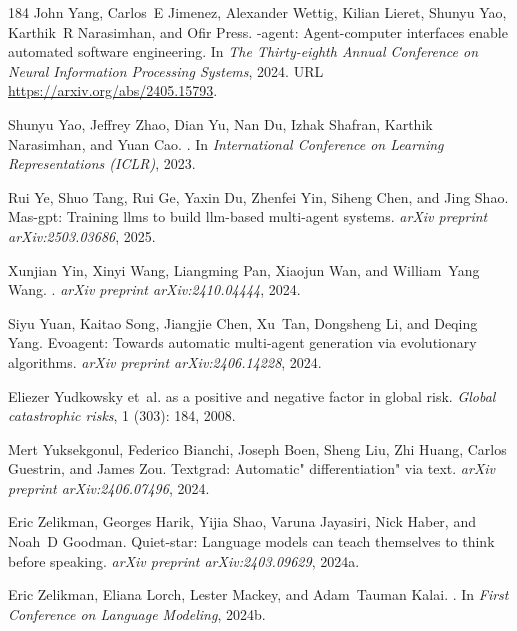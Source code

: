 \begin{thebibliography}{184}
John Yang, Carlos~E Jimenez, Alexander Wettig, Kilian Lieret, Shunyu Yao,
  Karthik~R Narasimhan, and Ofir Press.
-agent: Agent-computer interfaces enable automated software
  engineering.
\newblock In \emph{The Thirty-eighth Annual Conference on Neural Information
  Processing Systems}, 2024.
\newblock URL \url{https://arxiv.org/abs/2405.15793}.

Shunyu Yao, Jeffrey Zhao, Dian Yu, Nan Du, Izhak Shafran, Karthik Narasimhan,
  and Yuan Cao.
.
\newblock In \emph{International Conference on Learning Representations
  (ICLR)}, 2023.

Rui Ye, Shuo Tang, Rui Ge, Yaxin Du, Zhenfei Yin, Siheng Chen, and Jing Shao.
\newblock Mas-gpt: Training llms to build llm-based multi-agent systems.
\newblock \emph{arXiv preprint arXiv:2503.03686}, 2025.

Xunjian Yin, Xinyi Wang, Liangming Pan, Xiaojun Wan, and William~Yang Wang.
.
\newblock \emph{arXiv preprint arXiv:2410.04444}, 2024.

Siyu Yuan, Kaitao Song, Jiangjie Chen, Xu~Tan, Dongsheng Li, and Deqing Yang.
\newblock Evoagent: Towards automatic multi-agent generation via evolutionary
  algorithms.
\newblock \emph{arXiv preprint arXiv:2406.14228}, 2024.

Eliezer Yudkowsky et~al.
 as a positive and negative factor in global
  risk.
\newblock \emph{Global catastrophic risks}, 1 (303): 184,
  2008.

Mert Yuksekgonul, Federico Bianchi, Joseph Boen, Sheng Liu, Zhi Huang, Carlos
  Guestrin, and James Zou.
\newblock Textgrad: Automatic" differentiation" via text.
\newblock \emph{arXiv preprint arXiv:2406.07496}, 2024.

Eric Zelikman, Georges Harik, Yijia Shao, Varuna Jayasiri, Nick Haber, and
  Noah~D Goodman.
\newblock Quiet-star: Language models can teach themselves to think before
  speaking.
\newblock \emph{arXiv preprint arXiv:2403.09629}, 2024{a}.

Eric Zelikman, Eliana Lorch, Lester Mackey, and Adam~Tauman Kalai.
.
\newblock In \emph{First Conference on Language Modeling}, 2024{b}.


\end{thebibliography}
